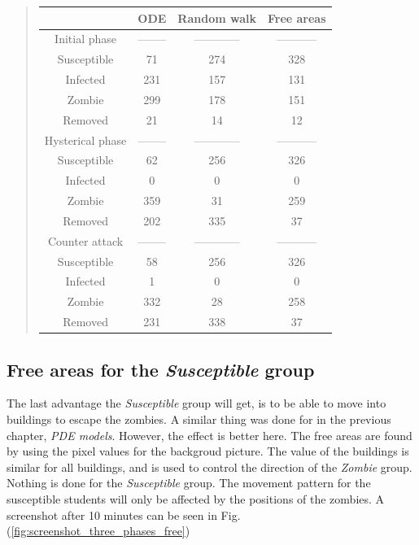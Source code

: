 \documentclass[%
twoside,                 %
final,                   %
chapterprefix=true,      %
open=right               %
10pt]{book}
\begin{document}
\begin{quote}
\begin{tabular}{cccc}
\hline
\multicolumn{1}{c}{  } & \multicolumn{1}{c}{ ODE } & \multicolumn{1}{c}{ Random walk } & \multicolumn{1}{c}{ Free areas } \\
\hline
Initial phase    & -------- & ------------ & ----------- \\
\hline
Susceptible      & 71       & 274          & 328         \\
Infected         & 231      & 157          & 131         \\
Zombie           & 299      & 178          & 151         \\
Removed          & 21       & 14           & 12          \\
\hline
Hysterical phase & -------- & ------------ & ----------- \\
\hline
Susceptible      & 62       & 256          & 326         \\
Infected         & 0        & 0            & 0           \\
Zombie           & 359      & 31           & 259         \\
Removed          & 202      & 335          & 37          \\
\hline
Counter attack   & -------- & ------------ & ----------- \\
\hline
Susceptible      & 58       & 256          & 326         \\
Infected         & 1        & 0            & 0           \\
Zombie           & 332      & 28           & 258         \\
Removed          & 231      & 338          & 37          \\
\hline
\end{tabular}
\end{quote}

\noindent




\subsection{Free areas for the \emph{Susceptible} group}
The last advantage the \emph{Susceptible} group will get, is to be able to move into buildings to escape the zombies. A similar thing was done for in the previous chapter, \emph{PDE models}. However, the effect is better here. The free areas are found by using the pixel values for the backgroud picture. The value of the buildings is similar for all buildings, and is used to control the direction of the \emph{Zombie} group. Nothing is done for the \emph{Susceptible} group. The movement pattern for the susceptible students will only be affected by the positions of the zombies. A screenshot after 10 minutes can be seen in Fig.(\ref{fig:screenshot_three_phases_free})
\end{document}
